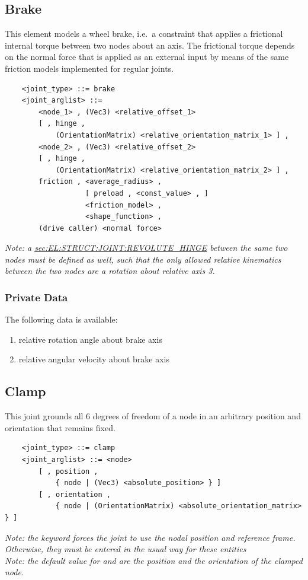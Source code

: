 \subsection{Brake}
This element models a wheel brake, i.e.\ a constraint that applies
a frictional internal torque between two nodes about an axis.
The frictional torque depends on the normal force that is applied 
as an external input by means of the same friction models implemented
for regular joints.
\begin{verbatim}
    <joint_type> ::= brake
    <joint_arglist> ::= 
        <node_1> , (Vec3) <relative_offset_1> 
        [ , hinge , 
            (OrientationMatrix) <relative_orientation_matrix_1> ] ,
        <node_2> , (Vec3) <relative_offset_2>
        [ , hinge , 
            (OrientationMatrix) <relative_orientation_matrix_2> ] ,
        friction , <average_radius> , 
                   [ preload , <const_value> , ]
                   <friction_model> , 
                   <shape_function> ,
        (drive caller) <normal force>
\end{verbatim}
\emph{Note: a
\hyperref{\kw{revolute hinge}}{\kw{revolute hinge} (see Section~}{)}{sec:EL:STRUCT:JOINT:REVOLUTE_HINGE}
between the same two nodes must be defined as well, such that
the only allowed relative kinematics between the two nodes are
a rotation about relative axis 3.
}

\subsubsection{Private Data}
The following data is available:
\begin{enumerate}
\item {} relative rotation angle about brake axis
\item {} relative angular velocity about brake axis
\end{enumerate}




\subsection{Clamp}
This joint grounds all 6 degrees of freedom of a node
in an arbitrary position and orientation that remains fixed.
\begin{verbatim}
    <joint_type> ::= clamp 
    <joint_arglist> ::= <node>
        [ , position ,
            { node | (Vec3) <absolute_position> } ]
        [ , orientation ,
            { node | (OrientationMatrix) <absolute_orientation_matrix> } ]
\end{verbatim}
\emph{Note: the keyword  forces the joint to use
the nodal position and reference frame. Otherwise, they must be entered
in the usual way for these entities} \\
\emph{Note: the default value for  and 
are the position and the orientation of the clamped node.}

